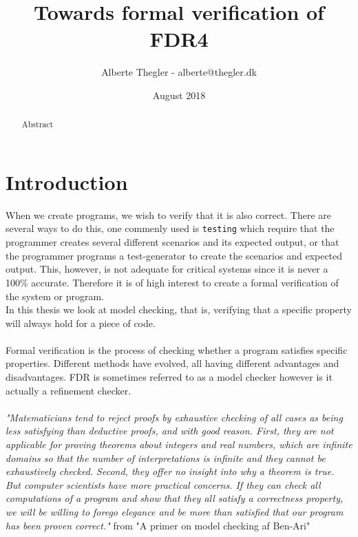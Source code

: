 \documentclass[a4paper]{report}
\title{Towards formal verification of FDR4}
\author{Alberte Thegler - alberte@thegler.dk}
\date{August 2018}
\begin{document}
\maketitle

\begin{abstract}
\begin{doublespace}
Abstract

\end{doublespace}
\end{abstract}



\newpage
\tableofcontents

\newpage
{}
\chapter{Introduction}
When we create programs, we wish to verify that it is also correct. There are several ways to do this, one commenly used is \texttt{testing} which require that the programmer creates several different scenarios and its expected output, or that the programmer programs a test-generator to create the scenarios and expected output. This, however, is not adequate for critical systems since it is never a 100\% accurate. Therefore it is of high interest to create a formal verification of the system or program.\\


In this thesis we look at model checking, that is, verifying that a specific property will always hold for a piece of code.
\\\\

Formal verification is the process of checking whether a program satisfies specific properties. Different methods have evolved, all having different advantages and disadvantages. FDR is sometimes referred to as a model checker however is it actually a refinement checker.
\\\\


\textit{"Matematicians tend to reject proofs by exhaustive checking of all cases as being less satisfying than deductive proofs, and with good reason. First, they are not applicable for proving theorems about integers and real numbers, which are infinite domains so that the number of interpretations is infinite and they cannot be exhaustively checked. Second, they offer no insight into why a theorem is true. But computer scientists have more practical concerns. If they can check all computations of a program and show that they all satisfy a correctness property, we will be willing to forego elegance and be more than satisfied that our program has been proven correct."} from "A primer on model checking af Ben-Ari" \cite{Ben-ari2010}
\end{document}
